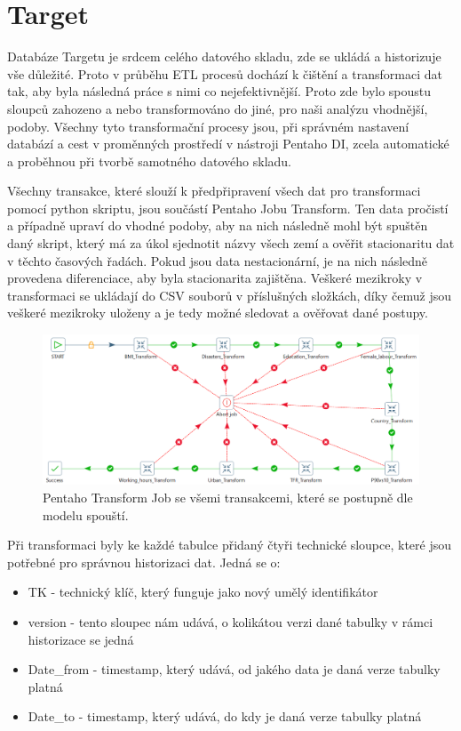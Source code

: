 \documentclass[thesis=M,czech]{FITthesis}[2022/10/08]
\begin{document}
\section{Target}

Databáze Targetu je srdcem celého datového skladu, zde se ukládá a historizuje vše důležité. Proto v průběhu ETL procesů dochází k čištění a transformaci dat tak, aby byla následná práce s nimi co nejefektivnější. Proto zde bylo spoustu sloupců zahozeno a nebo transformováno do jiné, pro naši analýzu vhodnější, podoby. Všechny tyto transformační procesy jsou, při správném nastavení databází a cest v proměnných prostředí v nástroji Pentaho DI, zcela automatické a proběhnou při tvorbě samotného datového skladu. 

Všechny transakce, které slouží k předpřipravení všech dat pro transformaci pomocí python skriptu, jsou součástí Pentaho Jobu Transform. Ten data pročistí a případně upraví do vhodné podoby, aby na nich následně mohl být spuštěn daný skript, který má za úkol sjednotit názvy všech zemí a ověřit stacionaritu dat v těchto časových řadách. Pokud jsou data nestacionární, je na nich následně provedena diferenciace, aby byla stacionarita zajištěna. Veškeré mezikroky v transformaci se ukládají do CSV souborů v příslušných složkách, díky čemuž jsou veškeré mezikroky uloženy a je tedy možné sledovat a ověřovat dané postupy.

\begin{figure}
    \centering
    \includegraphics[width=\textwidth]{DP-obrazky/Transform.png}
    \caption{Pentaho Transform Job se všemi transakcemi, které se postupně dle modelu spouští.}
    \label{fig:Transform_ETL}
\end{figure}

Při transformaci byly ke každé tabulce přidaný čtyři technické sloupce, které jsou potřebné pro správnou historizaci dat. Jedná se o:

\begin{itemize}
    \item TK - technický klíč, který funguje jako nový umělý identifikátor
    \item version - tento sloupec nám udává, o kolikátou verzi dané tabulky v rámci historizace se jedná
    \item Date\_from - timestamp, který udává, od jakého data je daná verze tabulky platná
    \item Date\_to - timestamp, který udává, do kdy je daná verze tabulky platná
\end{itemize}
\end{document}

